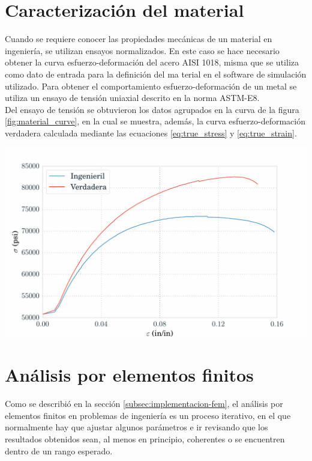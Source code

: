 \section{Caracterización del material}

Cuando se requiere conocer las propiedades mecánicas de un material en ingeniería, se utilizan ensayos 
normalizados. En este caso se hace necesario obtener la curva esfuerzo-deformación del 
acero AISI 1018, misma que se utiliza como dato de entrada para la definición del ma
    terial 
en el software de simulación utilizado. Para obtener el comportamiento esfuerzo-deformación 
de un metal se utiliza un ensayo de tensión uniaxial descrito en la norma ASTM-E8. ~\cite{ASTME8} \\

Del ensayo de tensión se obtuvieron los datos agrupados en la curva de la figura \ref{fig:material_curve}, 
en la cual se muestra, además, la curva esfuerzo-deformación verdadera calculada mediante las ecuaciones 
\ref{eq:true_stress} y \ref{eq:true_strain}.

\begin{center}
\includegraphics[scale=0.6]{src/ch3/material_curve.pdf}
\label{fig:material_curve}
\end{center}

\section{Análisis por elementos finitos}

Como se describió en la sección \ref{subsec:implementacion-fem}, el análisis por elementos 
finitos en problemas de ingeniería es un proceso iterativo, en el que normalmente hay que ajustar 
algunos parámetros e ir revisando que los resultados obtenidos sean, al menos en principio, 
coherentes o se encuentren dentro de un rango esperado. \\

